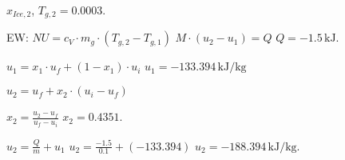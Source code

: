 \( x_{Ice,2} \), \( T_{g,2} = 0.0003 \).  

EW:  
\( NU = c_V \cdot m_g \cdot (T_{g,2} - T_{g,1}) \)  
\( M \cdot (u_2 - u_1) = Q \)  
\( Q = -1.5 \, \text{kJ} \).  

\( u_1 = x_1 \cdot u_f + (1 - x_1) \cdot u_i \)  
\( u_1 = -133.394 \, \text{kJ/kg} \)  

\( u_2 = u_f + x_2 \cdot (u_i - u_f) \)  

\( x_2 = \frac{u_2 - u_f}{u_f - u_i} \)  
\( x_2 = 0.4351 \).  

\( u_2 = \frac{Q}{m} + u_1 \)  
\( u_2 = \frac{-1.5}{0.1} + (-133.394) \)  
\( u_2 = -188.394 \, \text{kJ/kg} \).